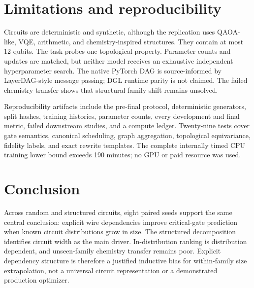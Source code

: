 \documentclass[10pt,twocolumn]{article}
\begin{document}
\section{Limitations and reproducibility}

Circuits are deterministic and synthetic, although the replication uses QAOA-like, VQE, arithmetic, and chemistry-inspired structures. They contain at most 12 qubits. The task probes one topological property. Parameter counts and updates are matched, but neither model receives an exhaustive independent hyperparameter search. The native PyTorch DAG is source-informed by LayerDAG-style message passing; DGL runtime parity is not claimed. The failed chemistry transfer shows that structural family shift remains unsolved.

Reproducibility artifacts include the pre-final protocol, deterministic generators, split hashes, training histories, parameter counts, every development and final metric, failed downstream studies, and a compute ledger. Twenty-nine tests cover gate semantics, canonical scheduling, graph aggregation, topological equivariance, fidelity labels, and exact rewrite templates. The complete internally timed CPU training lower bound exceeds 190 minutes; no GPU or paid resource was used.

\section{Conclusion}

Across random and structured circuits, eight paired seeds support the same central conclusion: explicit wire dependencies improve critical-gate prediction when known circuit distributions grow in size. The structured decomposition identifies circuit width as the main driver. In-distribution ranking is distribution dependent, and unseen-family chemistry transfer remains poor. Explicit dependency structure is therefore a justified inductive bias for within-family size extrapolation, not a universal circuit representation or a demonstrated production optimizer.



\end{document}
